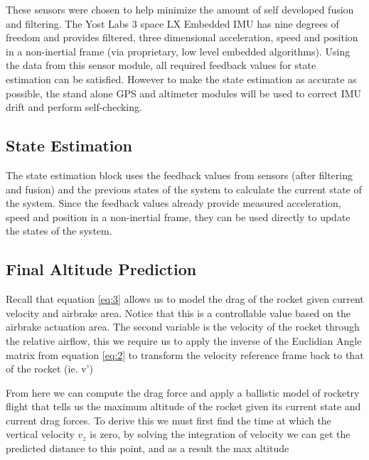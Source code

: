 \documentclass[conference, letterpaper]{IEEEtran}
\begin{document}
These sensors were chosen to help minimize the amount of self developed fusion and
filtering. The Yost Labs 3 space LX Embedded IMU has nine degrees of freedom and
provides filtered, three dimensional acceleration, speed and position in a
non-inertial frame (via proprietary, low level embedded algorithms)\citep{yost}. Using the data
from this sensor module, all required feedback values for state estimation can be
satisfied. However to make the state estimation as accurate as possible, the
stand alone GPS and altimeter modules will be used to correct IMU drift and
perform self-checking.

\subsection{State Estimation}

The state estimation block uses the feedback values from sensors (after filtering and fusion)
and the previous states of the system to calculate the current state of the system.
Since the feedback values already provide measured acceleration, speed and position
in a non-inertial frame, they can be used directly to update the states of the system.

\subsection{Final Altitude Prediction}

Recall that equation \ref{eq:3} allows us to model the drag of the rocket given current velocity and
airbrake area. Notice that this is a controllable value based on the airbrake actuation area.  The second
variable is the velocity of the rocket through the relative airflow, this we require us to apply the
inverse of the Euclidian Angle matrix from equation \ref{eq:2} to transform the velocity reference frame
back to that of the rocket (ie. v')

From here we can compute the drag force and apply a ballistic model of rocketry flight that tells us
the maximum altitude of the rocket given its current state and current drag forces. To derive this
we must first find the time at which the vertical velocity $v_{z}$ is zero, by solving the integration of velocity
we can get the predicted distance to this point, and as a result the max altitude

\begin{equation}\label{eq:5}
\end{equation}

\begin{equation}\label{eq:6}
\end{equation}
\end{document}
